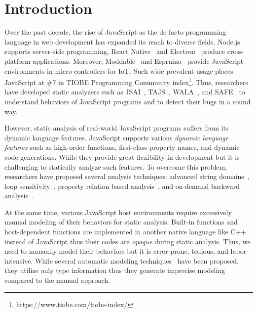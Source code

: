 \section{Introduction}\label{sec:intro}

Over the past decade, the rise of JavaScript as the de facto programming
language in web development has expanded its reach to diverse fields.
Node.js~\cite{nodejs} supports server-side programming, React
Native~\cite{react-native} and Electron~\cite{electron} produce cross-platform
applications.  Moreover, Moddable~\cite{moddable} and Espruino~\cite{espruino}
provide JavaScript environments in micro-controllers for IoT.  Such wide prevalent
usage places JavaScript at \#7 in TIOBE Programming Community
index\footnote{https://www.tiobe.com/tiobe-index/}.  Thus, researchers have
developed static analyzers such as JSAI~\cite{jsai}, TAJS~\cite{tajs},
WALA~\cite{wala}, and SAFE~\cite{safe,safe2} to understand behaviors of
JavaScript programs and to detect their bugs in a sound way.

However, static analysis of real-world JavaScript programs suffers from its
dynamic language features.  JavaScript supports various \textit{dynamic language
features} such as high-order functions, first-class property names, and dynamic
code generations.  While they provide great flexibility in development but it is
challenging to statically analyze such features.  To overcome this problem,
researchers have proposed several analysis techniques: advanced string
domains~\cite{string, regex, combining-string}, loop sensitivity~\cite{lsaECOOP,
lsaSPE}, property relation based analysis~\cite{correlation, weaklyAPLAS,
weaklySPE, value-partitioning}, and on-demand backward
analysis~\cite{value-refinement}.

At the same time, various JavaScript host environments require excessively
manual modeling of their behaviors for static analysis.  Built-in functions and
host-dependent functions are implemented in another native language like C++
instead of JavaScript thus their codes are \textit{opaque} during static
analysis.  Thus, we need to manually model their behaviors but it is
error-prone, tedious, and labor-intensive.  While several automatic modeling
techniques~\cite{safewapi, model-ts} have been proposed, they utilize only type
information thus they generate imprecise modeling compared to the manual
approach.

